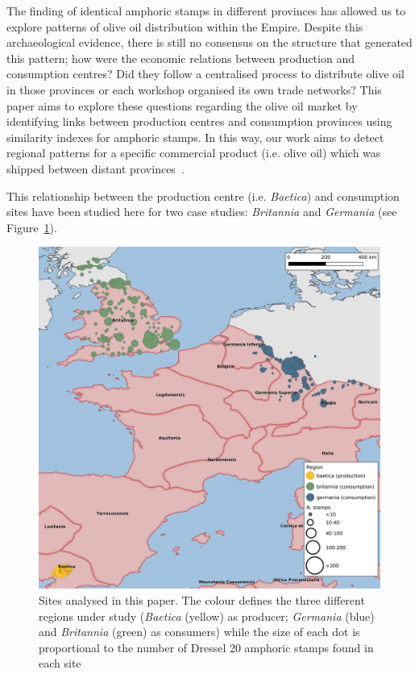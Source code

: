 The finding of identical amphoric stamps in different provinces has allowed us to explore patterns of olive oil distribution within the Empire. Despite this archaeological evidence, there is still no consensus on the structure that generated this pattern; how were the economic relations between production and consumption centres? Did they follow a centralised process to distribute olive oil in those provinces or each workshop organised its own trade networks?
This paper aims to explore these questions regarding the olive oil market by identifying links between production centres and consumption provinces using similarity indexes for amphoric stamps. In this way, our work aims to detect regional patterns for a specific commercial product (i.e. olive oil) which was shipped between distant provinces~\citep{isaksen_network_2006}. 
 
This relationship between the production centre (i.e. \textit{Baetica}) and consumption sites have been studied here for two case studies: \textit{Britannia} and \textit{Germania} (see Figure~\ref{general}).

\begin{figure}[htp]
	\centering
\includegraphics[width=\linewidth]{general_map}
\caption{Sites analysed in this paper. The colour defines the three different regions under study (\textit{Baetica} (yellow) as producer; \textit{Germania} (blue) and \textit{Britannia} (green) as consumers) while the size of each dot is proportional to the number of Dressel 20 amphoric stamps found in each site}

\label{general}
\end{figure} 
        

